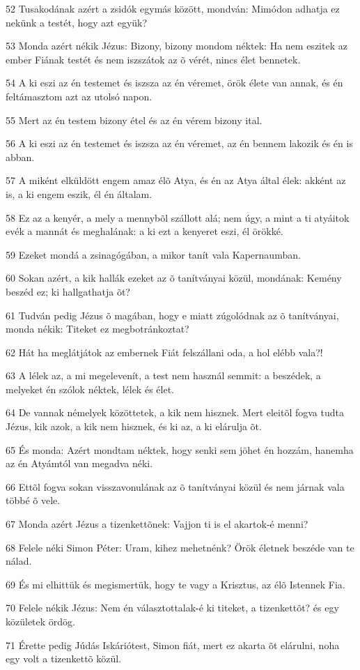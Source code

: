 \par 52 Tusakodának azért a zsidók egymás között, mondván: Mimódon adhatja ez nekünk a testét, hogy azt együk?
\par 53 Monda azért nékik Jézus: Bizony, bizony mondom néktek: Ha nem eszitek az ember Fiának testét és nem iszszátok az õ vérét, nincs élet bennetek.
\par 54 A ki eszi az én testemet és iszsza az én véremet, örök élete van annak, és én feltámasztom azt az utolsó napon.
\par 55 Mert az én testem bizony étel és az én vérem bizony ital.
\par 56 A ki eszi az én testemet és iszsza az én véremet, az én bennem lakozik és én is abban.
\par 57 A miként elküldött engem amaz élõ Atya, és én az Atya által élek: akként az is, a ki engem eszik, él én általam.
\par 58 Ez az a kenyér, a mely a mennybõl szállott alá; nem úgy, a mint a ti atyáitok evék a mannát és meghalának: a ki ezt a kenyeret eszi, él örökké.
\par 59 Ezeket mondá a zsinagógában, a mikor tanít vala Kapernaumban.
\par 60 Sokan azért, a kik hallák ezeket az õ tanítványai közül, mondának: Kemény beszéd ez; ki hallgathatja õt?
\par 61 Tudván pedig Jézus õ magában, hogy e miatt zúgolódnak az õ tanítványai, monda nékik: Titeket ez megbotránkoztat?
\par 62 Hát ha meglátjátok az embernek Fiát felszállani oda, a hol elébb vala?!
\par 63 A lélek az, a mi megelevenít, a test nem használ semmit: a beszédek, a melyeket én szólok néktek, lélek és élet.
\par 64 De vannak némelyek közöttetek, a kik nem hisznek. Mert eleitõl fogva tudta Jézus, kik azok, a kik nem hisznek, és ki az,  a ki elárulja õt.
\par 65 És monda: Azért mondtam néktek, hogy senki sem jöhet én hozzám, hanemha az én Atyámtól van megadva néki.
\par 66 Ettõl fogva sokan visszavonulának az õ tanítványai közül és nem járnak vala többé õ vele.
\par 67 Monda azért Jézus a tizenkettõnek: Vajjon ti is el akartok-é menni?
\par 68 Felele néki Simon Péter: Uram, kihez mehetnénk? Örök életnek beszéde van te nálad.
\par 69 És mi elhittük és megismertük, hogy te vagy a Krisztus, az élõ Istennek Fia.
\par 70 Felele nékik Jézus: Nem én választottalak-é ki titeket, a tizenkettõt? és egy közületek ördög.
\par 71 Érette pedig Júdás Iskáriótest, Simon fiát, mert ez akarta õt elárulni, noha egy volt a tizenkettõ közül.

